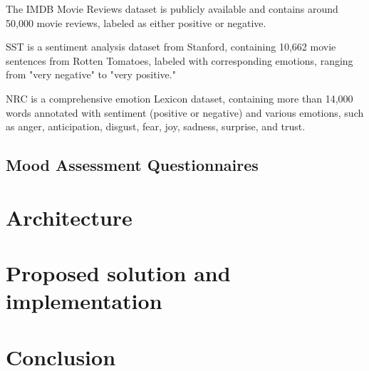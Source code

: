 \documentclass[a4paper,fleqn]{cas-dc}
\begin{document}
The IMDB Movie Reviews dataset \cite{IMDB} is publicly available and contains around 50,000 movie reviews, labeled as either positive or negative.

SST \cite{SST} is a sentiment analysis dataset from Stanford, containing 10,662 movie sentences from Rotten Tomatoes, labeled with corresponding emotions, ranging from "very negative" to "very positive."

NRC \cite{SaifmohammadLexicons} is a comprehensive emotion Lexicon dataset, containing more than 14,000 words annotated with sentiment (positive or negative) and various emotions, such as anger, anticipation, disgust, fear, joy, sadness, surprise, and trust.

\subsection{Mood Assessment Questionnaires}


\section{Architecture}
\label{architecture}

\section{Proposed solution and implementation}
\label{proposedSolution}

\section{Conclusion}
\label{conclusion}
\printcredits

%
%



\end{document}
